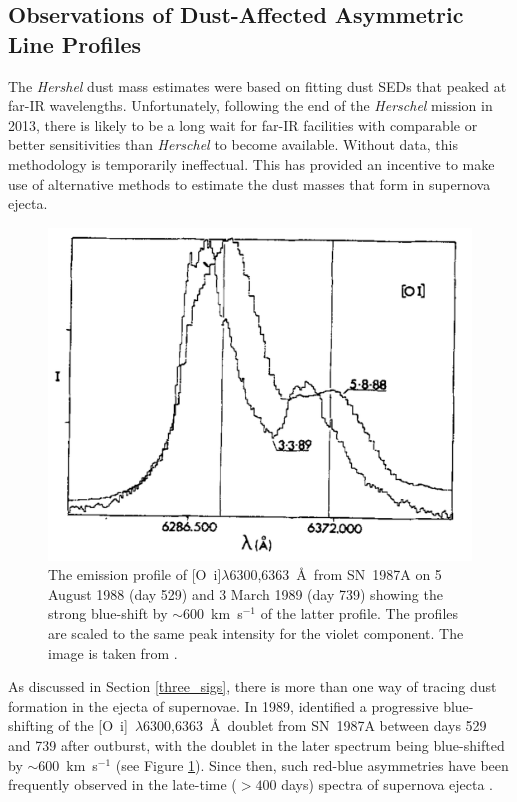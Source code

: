  \subsection{Observations of Dust-Affected Asymmetric Line Profiles}

The {\em Hershel} dust mass estimates were based on fitting dust SEDs that peaked at far-IR wavelengths. Unfortunately, following the end of the {\em Herschel} mission in 2013, there is likely to be a long wait for far-IR facilities with comparable or better sensitivities than {\em Herschel} to become available.  Without data, this methodology is temporarily ineffectual.  This has provided an incentive to make use of alternative methods to estimate the dust masses that form in supernova ejecta.

\begin{figure}
\centering
\includegraphics[clip=true,scale=0.45,trim= 0 0 0 0,angle=1]{chapters/chapter1/figs/LucyOI.png}
\caption{The emission profile of [O~{\sc i}]$\lambda$6300,6363~\AA\ from SN~1987A on 5 August 1988 (day 529) and 3 March 1989 (day 739) showing the strong blue-shift by $\sim600 $~km~s$^{-1}$ of the latter profile.  The profiles are scaled to the same peak intensity for the violet component.  The image is taken from \citet{Lucy1989}.}
\label{fig:Lucy_orig}
\end{figure}


As discussed in Section \ref{three_sigs}, there is more than one way of tracing dust formation in the ejecta of supernovae.  In 1989, \citeauthor{Lucy1989} identified a progressive blue-shifting of the [O~{\sc i}]~$\lambda$6300,6363~\AA\ doublet from SN~1987A between days 529 and 739 after outburst, with the doublet in the later spectrum being blue-shifted by $\sim600 $~km~s$^{-1}$ (see Figure \ref{fig:Lucy_orig}). Since then, such red-blue asymmetries have been frequently observed in the late-time ($ > 400$ days) spectra of supernova ejecta  .


